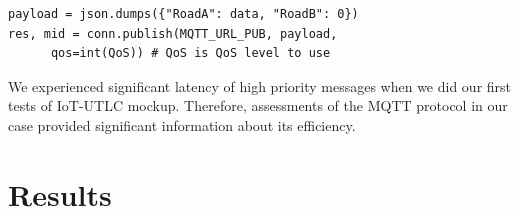 \documentclass[conference]{../../setup/IEEEtran}
\begin{document}
\begin{footnotesize}
\begin{lstlisting}
payload = json.dumps({"RoadA": data, "RoadB": 0})
res, mid = conn.publish(MQTT_URL_PUB, payload,
	  qos=int(QoS)) # QoS is QoS level to use 
\end{lstlisting}
\end{footnotesize}


                                                                                                                                                        
We experienced significant latency of high priority messages when we did our first tests of IoT-UTLC mockup. Therefore, assessments of the MQTT protocol in our case provided significant information about its efficiency. 

%
%

\section{Results} \label{sec:Results}
\end{document}
